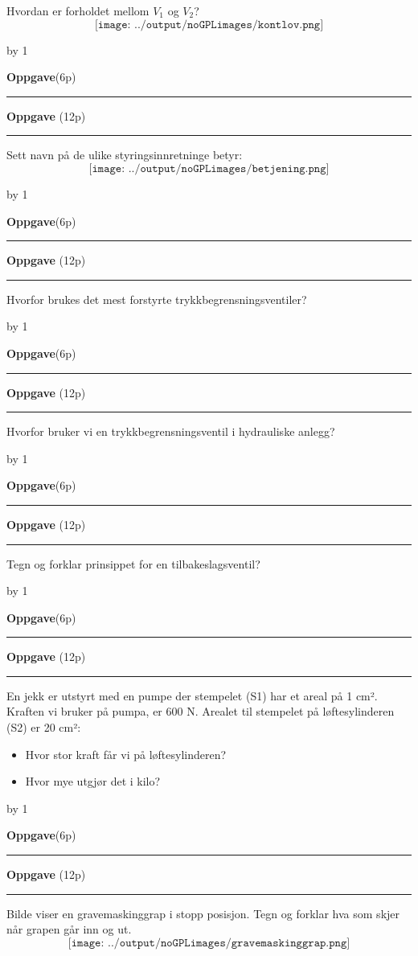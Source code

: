 \documentclass[12pt,a4paper]{article}
\def\oppgave{
            \advance\questnum by 1
	    \ifthenelse{\questnum>0\AND \questnum<9}
	    {
                \vskip 1cm
		\textbf{Oppgave}\hskip 5pt\the\questnum \hfill \hfill(6p)
		\vskip 3pt
		\hrule
	\vskip 0.5cm}
	{
                \vskip 1cm
		\textbf{Oppgave}\hskip 5pt \the\questnum \hfill \hfill(12p)
		\vskip 3pt \hrule \vskip 0.5cm }

		}
\begin{document}
Hvordan er forholdet mellom $V_1$ og $V_2$?
\vskip 5pt 
$$\texttt{[image: ../output/noGPLimages/kontlov.png]}$$
\vskip 5pt 
\vskip 2.5pt 
\oppgave{}%
\vskip 2.5pt 
Sett navn på de ulike styringsinnretninge betyr:
$$\texttt{[image: ../output/noGPLimages/betjening.png]}$$
\vskip 5pt 
\vskip 2.5pt 
\newpage
\oppgave{}%
\vskip 2.5pt 
Hvorfor brukes det mest forstyrte trykkbegrensningsventiler?
\vskip 5pt 
\vskip 2.5pt 
\oppgave{}%
\vskip 2.5pt 
Hvorfor bruker vi en trykkbegrensningsventil i hydrauliske anlegg?
\vskip 5pt 
\vskip 2.5pt 
\newpage
\oppgave{}%
\vskip 2.5pt 
Tegn og forklar prinsippet for en tilbakeslagsventil?
\vskip 5pt 
\vskip 2.5pt 
\oppgave{}%
\vskip 2.5pt 
En jekk er utstyrt med en pumpe der stempelet (S1) har et areal på 1 cm². Kraften vi bruker på pumpa, er 600 N. Arealet til stempelet på løftesylinderen (S2) er 20 cm²:
\begin{itemize}
	\item Hvor stor kraft får vi på løftesylinderen?
	\item Hvor mye utgjør det i kilo?
\end{itemize}
\vskip 5pt 
\vskip 2.5pt 
\newpage
\oppgave{}%
\vskip 2.5pt 
Bilde viser en gravemaskinggrap i stopp posisjon. Tegn og forklar hva som skjer når grapen går inn og ut. 
$$\texttt{[image: ../output/noGPLimages/gravemaskinggrap.png]}$$
\vskip 5pt 
\vskip 2.5pt 
\newpage
\end{document}
